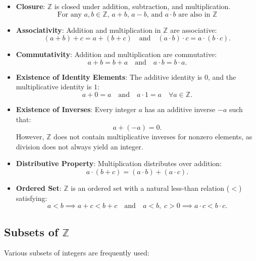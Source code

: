 \begin{itemize}
    \item \textbf{Closure}: \( \mathbb{Z} \) is closed under addition, subtraction, and multiplication. 
    \[
      \text{For any } a, b \in \mathbb{Z} \text{, } a + b  \text{,  }  a - b \text{, and }  a \cdot b \text{ are also in } \mathbb{Z}
    \]
    \item \textbf{Associativity}: Addition and multiplication in \( \mathbb{Z} \) are associative:
    \[
    (a + b) + c = a + (b + c) \quad \text{and} \quad (a \cdot b) \cdot c = a \cdot (b \cdot c).
    \]
    \item \textbf{Commutativity}: Addition and multiplication are commutative:
    \[
    a + b = b + a \quad \text{and} \quad a \cdot b = b \cdot a.
    \]
    \item \textbf{Existence of Identity Elements}: The additive identity is \( 0 \), and the multiplicative identity is \( 1 \):
    \[
    a + 0 = a \quad \text{and} \quad a \cdot 1 = a \quad \forall a \in \mathbb{Z}.
    \]
    \item \textbf{Existence of Inverses}: Every integer \( a \) has an additive inverse \( -a \) such that:
    \[
    a + (-a) = 0.
    \]
    However, \( \mathbb{Z} \) does not contain multiplicative inverses for nonzero elements, as division does not always yield an integer.
    
    \vspace{\baselineskip}\par
    \item \textbf{Distributive Property}: Multiplication distributes over addition:
    \[
    a \cdot (b + c) = (a \cdot b) + (a \cdot c).
    \]
    \item \textbf{Ordered Set}: \( \mathbb{Z} \) is an ordered set with a natural less-than relation (\( < \)) satisfying:
    \[
    a < b \implies a + c < b + c \quad \text{and} \quad a < b, \; c > 0 \implies a \cdot c < b \cdot c.
    \]
\end{itemize}


\subsection{Subsets of \( \mathbb{Z} \)}
Various subsets of integers are frequently used:

